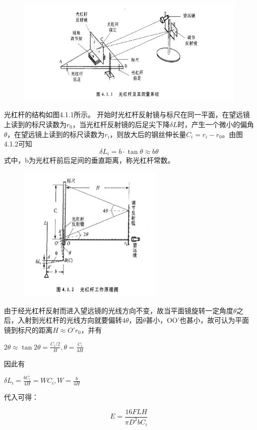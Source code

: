 \documentclass[11pt,a4paper,oneside]{article}
\begin{document}
\begin{figure}[H]
\centering
  \includegraphics[width=12cm]{Image/光杠杆及其测量系统.png}
\end{figure}
光杠杆的结构如图4.1.1所示。
开始时光杠杆反射镜与标尺在同一平面，在望远镜上读到的标尺读数为$r_0$，当光杠杆反射镜的后足尖下降$\delta L$时，产生一个微小的偏角$\theta $，在望远镜上读到的标尺读数为$r_{i}$，则放大后的钢丝伸长量$C_{i}=r_i-r_0$。由图4.1.2可知
$$ \delta L_i=b\cdot \tan \theta \approx b\theta $$
式中，b为光杠杆前后足间的垂直距离，称光杠杆常数。
\begin{figure}[H]
\centering
  \includegraphics[width=7cm]{Image/光杠杆工作原理图.png}
\end{figure}
由于经光杠杆反射而进入望远镜的光线方向不变，故当平面镜旋转一定角度$\theta$之后，入射到光杠杆的光线方向就要偏转$4\theta$，因$\theta$甚小，OO'也甚小，故可认为平面镜到标尺的距离$H\approx O'r_0$，并有
\begin{center}
$2\theta \approx \tan 2\theta = \displaystyle\frac{C_i/2}{H},\theta =\displaystyle\frac{C_i}{4H}$
\end{center}
因此有
\begin{center}
$\delta L_i=\displaystyle\frac{bC_i}{4H}=WC_i,W=\displaystyle\frac{b}{4H}$
\end{center}
代入可得：

$$ E=\displaystyle\frac{16FLH}{\pi D^2bC_i}$$
\end{document}
